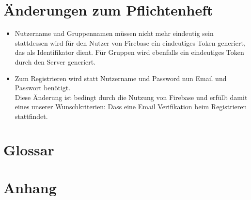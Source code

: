 \documentclass[a4paper]{scrreprt}
\begin{document}
\chapter{Änderungen zum Pflichtenheft}
\begin{itemize}
	\item Nutzername und Gruppennamen müssen nicht mehr eindeutig sein \\
	stattdessen wird für den Nutzer von Firebase ein eindeutiges Token generiert, das als Identifikator dient. Für Gruppen wird ebenfalls ein eindeutiges Token durch den Server generiert.
	\item Zum Registrieren wird statt Nutzername und Password nun Email und Passwort benötigt. \\Diese Änderung ist bedingt durch die Nutzung von Firebase und erfüllt damit eines unserer Wunschkriterien: Dass eine Email Verifikation beim Registrieren stattfindet. 
\end{itemize}

\chapter{Glossar}

\chapter{Anhang}
\end{document}
